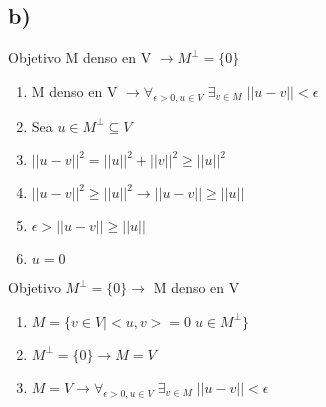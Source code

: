 \subsection*{b)}

Objetivo M denso en V $\to M^\perp = \{0\}$ 

\begin{enumerate}
	\item M denso en V $\to \forall_{\epsilon > 0, u \in V} \; \exists_{v \in M} \; ||u-v|| < \epsilon$
	\item Sea $u \in M^\perp \subseteq V$
	\item $||u-v||^2 = ||u||^2 + ||v||^2 \geq ||u||^2$
	\item $||u-v||^2 \geq ||u||^2 \to ||u-v|| \geq ||u||$
	\item $\epsilon > ||u-v|| \geq ||u||$
	\item $u = 0$
\end{enumerate}

Objetivo $M^\perp = \{0\} \to$ M denso en V

\begin{enumerate}
	\item $M = \{v \in V | <u, v> = 0 \; u \in M^\perp\}$
	\item $M^\perp = \{0\} \to M = V$
	\item $M = V \to \forall_{\epsilon > 0, u \in V} \; \exists_{v \in M} \; ||u-v|| < \epsilon$
\end{enumerate}
